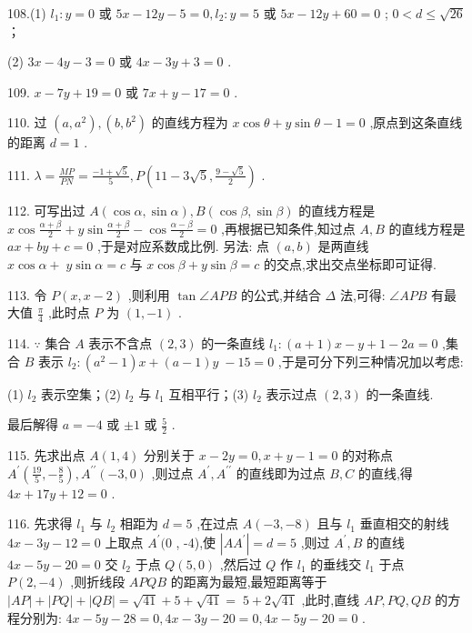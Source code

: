\documentclass[10pt]{article}
\newcommand*\circled[1]{\tikz[baseline=(char.base)]{\node[shape=circle,draw,inner sep=1.5pt] (char) {\small #1};}}
\begin{document}
108.(1) \circled{1}  \({l}_{1} : y = 0\) 或 \({5x} - {12y} - 5 = 0,{l}_{2} : y = 5\) 或 \({5x} - {12y} + {60} = 0\) ;  \circled{2}  \(0 < d \leq  \sqrt{26}\) ；

(2) \({3x} - {4y} - 3 = 0\) 或 \({4x} - {3y} + 3 = 0\) .

109. \(x - {7y} + {19} = 0\) 或 \({7x} + y - {17} = 0\) .

110. 过 \(\left( {a,{a}^{2}}\right) ,\left( {b,{b}^{2}}\right)\) 的直线方程为 \(x\cos \theta  + y\sin \theta  - 1 = 0\) ,原点到这条直线的距离 \(d = 1\) .

111. \(\lambda  = \frac{MP}{PN} = \frac{-1 + \sqrt{5}}{5},P\left( {{11} - 3\sqrt{5},\frac{9 - \sqrt{5}}{2}}\right)\) .

112. 可写出过 \(A\left( {\cos \alpha ,\sin \alpha }\right) ,B\left( {\cos \beta ,\sin \beta }\right)\) 的直线方程是 \(x\cos \frac{\alpha  + \beta }{2} + y\sin \frac{\alpha  + \beta }{2} - \cos \frac{\alpha  - \beta }{2} = 0\) ,再根据已知条件,知过点 \(A,B\) 的直线方程是 \({ax} + {by} + c = 0\) ,于是对应系数成比例. 另法: 点 \(\left( {a,b}\right)\) 是两直线 \(x\cos \alpha  + \; y\sin \alpha  = c\) 与 \(x\cos \beta  + y\sin \beta  = c\) 的交点,求出交点坐标即可证得.

113. 令 \(P\left( {x,x - 2}\right)\) ,则利用 \(\tan \angle {APB}\) 的公式,并结合 \(\Delta\) 法,可得: \(\angle {APB}\) 有最大值 \(\frac{\pi }{4}\) ,此时点 \(P\) 为 \(\left( {1, - 1}\right)\) .

114. \(\because\) 集合 \(A\) 表示不含点 \(\left( {2,3}\right)\) 的一条直线 \({l}_{1} : \left( {a + 1}\right) x - y + 1 - {2a} = 0\) ,集合 \(B\) 表示 \({l}_{2} : \left( {{a}^{2} - 1}\right) x + \left( {a - 1}\right) y \; - {15} = 0\) ,于是可分下列三种情况加以考虑:

(1) \({l}_{2}\) 表示空集；(2) \({l}_{2}\) 与 \({l}_{1}\) 互相平行；(3) \({l}_{2}\) 表示过点 \(\left( {2,3}\right)\) 的一条直线.

最后解得 \(a =  - 4\) 或 \(\pm  1\) 或 \(\frac{5}{2}\) .

115. 先求出点 \(A\left( {1,4}\right)\) 分别关于 \(x - {2y} = 0,x + y - 1 = 0\) 的对称点 \({A}^{\prime }\left( {\frac{19}{5}, - \frac{8}{5}}\right) ,{A}^{\prime \prime }\left( {-3,0}\right)\) ,则过点 \({A}^{\prime },{A}^{\prime \prime }\) 的直线即为过点 \(B,C\) 的直线,得 \({4x} + {17y} + {12} = 0\) .

116. 先求得 \({l}_{1}\) 与 \({l}_{2}\) 相距为 \(d = 5\) ,在过点 \(A\left( {-3, - 8}\right)\) 且与 \({l}_{1}\) 垂直相交的射线 \({4x} - {3y} - {12} = 0\) 上取点 \({A}^{\prime }(0\) , -4),使 \(\left| {A{A}^{\prime }}\right|  = d = 5\) ,则过 \({A}^{\prime },B\) 的直线 \({4x} - {5y} - {20} = 0\) 交 \({l}_{2}\) 于点 \(Q\left( {5,0}\right)\) ,然后过 \(Q\) 作 \({l}_{1}\) 的垂线交 \({l}_{1}\) 于点 \(P\left( {2, - 4}\right)\) ,则折线段 \({APQB}\) 的距离为最短,最短距离等于 \(\left| {AP}\right|  + \left| {PQ}\right|  + \left| {QB}\right|  = \sqrt{41} + 5 + \sqrt{41} = \; 5 + 2\sqrt{41}\) ,此时,直线 \({AP},{PQ},{QB}\) 的方程分别为: \({4x} - {5y} - {28} = 0,{4x} - {3y} - {20} = 0,{4x} - {5y} - {20} = 0\) .
\end{document}
